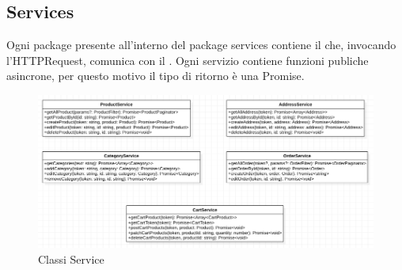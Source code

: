 \subsection{Services}
Ogni package presente all'interno del package services contiene il  che, invocando l'HTTPRequest, comunica con il . Ogni servizio contiene funzioni publiche asincrone, per questo motivo il tipo di ritorno è una Promise.
\begin{figure}[H]
	\centering
	\includegraphics[scale=0.5]{Immagini/Frontend/ClassiService.png}
	\caption{Classi Service}
	\label{fig:feService}
\end{figure}
